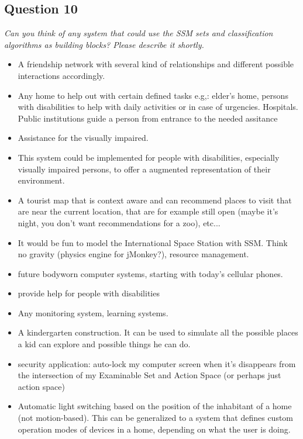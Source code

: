 \subsection{Question 10}\label{question2:10}
\emph{Can you think of any system that could use the SSM sets and classification algorithms as building blocks? Please describe it shortly.}

\begin{itemize}
	\item A friendship network with several kind of relationships and different possible interactions accordingly.
	\item Any home to help out with certain defined tasks e.g,: elder's home, persons with disabilities to help with daily activities or in case of urgencies. Hospitals. Public institutions guide a person from entrance to the needed assitance
	\item  Assistance for the visually impaired.
	\item  This system could be implemented for people with disabilities, especially visually impaired persons, to offer a augmented representation of their environment.
	\item  A tourist map that is context aware and can recommend places to visit that are near the current location, that are for example still open (maybe it's night, you don't want recommendations for a zoo), etc...
	\item  It would be fun to model the International Space Station with SSM. Think no gravity (physics engine for jMonkey?), resource management.
	\item  future bodyworn computer systems, starting with today's cellular phones.
	\item  provide help for people with disabilities
	\item  Any monitoring system, learning systems.
	\item  A kindergarten construction. It can be used to simulate all the possible places a kid can explore and possible things he can do.
	\item security application: auto-lock my computer screen when it's disappears from the intersection of my Examinable Set and Action Space (or perhaps just action space)
	\item Automatic light switching based on the position of the inhabitant of a home (not motion-based). This can be generalized to a system that defines custom operation modes of devices in a home, depending on what the user is doing.
\end{itemize}

